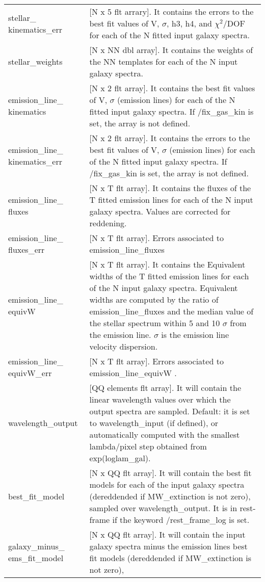 \begin{center}
\begin{longtable}{p{2.7cm}| p{11.1cm}}
  stellar\_ kinematics\_err &[N x 5 flt arrary].  It contains the errors to the best fit values of V, $\sigma$, h3, h4, and $\chi^2$/DOF for each of the N fitted input galaxy spectra.\\
  stellar\_weights        &[N x NN dbl array]. It contains the weights of the NN templates for each of the N input galaxy spectra.\\
  emission\_line\_ kinematics &[N x 2 flt array].  It contains the best fit values of V, $\sigma$ (emission lines) for each of the N fitted
                            input galaxy spectra. If /fix\_gas\_kin is set, the array is not defined.\\
 emission\_line\_ kinematics\_err & [N x 2 flt array].  It contains the errors to the best fit values of V, $\sigma$ (emission lines) for each of the N fitted input galaxy spectra. If /fix\_gas\_kin is set, the array is not defined.\\
 emission\_line\_ fluxes  &[N x T flt array].  It contains the fluxes of the T fitted emission lines for each of the N input galaxy spectra. Values are corrected for reddening.\\
%
 emission\_line\_ fluxes\_err &  [N x T flt array].  Errors associated to emission\_line\_fluxes \\
%
 emission\_line\_ equivW      & [N x T flt array]. It contains the Equivalent widths of the T fitted emission lines for each of the N input galaxy spectra.                            Equivalent widths are computed by the ratio of emission\_line\_fluxes and the median value of the stellar spectrum within 5 and 10 $\sigma$ from the emission line. $\sigma$ is the emission line velocity dispersion. \\
%
 emission\_line\_ equivW\_err  & [N x T flt array]. Errors associated to emission\_line\_equivW  . \\
%
 wavelength\_output     & [QQ elements flt array]. It will contain the linear wavelength values over which the output spectra are sampled. 
       Default: it is set to wavelength\_input (if defined), or automatically computed with the smallest lambda/pixel step obtained  from exp(loglam\_gal).\\
%
 best\_fit\_model      &[N x QQ flt array]. It will contain the best fit models for each of the input galaxy spectra (dereddended if 
                       MW\_extinction is not zero), sampled over wavelength\_output. It is in rest-frame if the keyword /rest\_frame\_log is set. \\
%
 galaxy\_minus\_ ems\_fit\_model &[N x QQ flt array]. It will contain the input galaxy spectra minus the emission lines best fit models (dereddended if MW\_extinction is not zero), 

\end{longtable}
\end{center}
